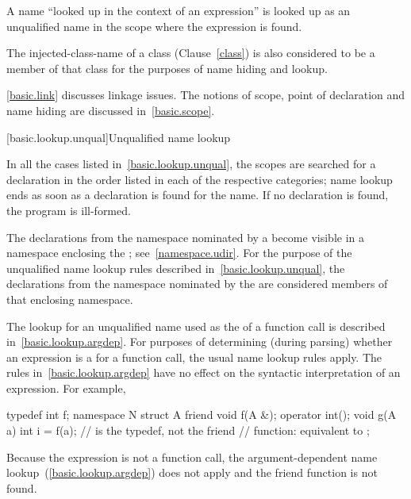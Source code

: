 \pnum
A name ``looked up in the context of an expression'' is looked up as an
unqualified name in the scope where the expression is found.

\pnum
The injected-class-name of a class (Clause~\ref{class}) is also
considered to be a member of that class for the purposes of name hiding
and lookup.

\pnum
\enternote \ref{basic.link} discusses linkage issues. The notions of
scope, point of declaration and name hiding are discussed
in~\ref{basic.scope}. \exitnote

[basic.lookup.unqual]{Unqualified name lookup}

\pnum
{}%
%
In all the cases listed in~\ref{basic.lookup.unqual}, the scopes are
searched for a declaration in the order listed in each of the respective
categories; name lookup ends as soon as a declaration is found for the
name. If no declaration is found, the program is ill-formed.

\pnum
The declarations from the namespace nominated by a
 become visible in a namespace enclosing the
; see~\ref{namespace.udir}. For the purpose of
the unqualified name lookup rules described
in~\ref{basic.lookup.unqual}, the declarations from the namespace
nominated by the  are considered members of
that enclosing namespace.

\pnum
The lookup for an unqualified name used as the
 of a function call is described
in~\ref{basic.lookup.argdep}. \enternote For purposes of determining
(during parsing) whether an expression is a
 for a function call, the usual name lookup
rules apply. The rules in~\ref{basic.lookup.argdep} have no effect on
the syntactic interpretation of an expression. For example,

\begin{codeblock}
typedef int f;
namespace N {
  struct A {
    friend void f(A &);
    operator int();
    void g(A a) {
      int i = f(a);         //  is the typedef, not the friend
                            // function: equivalent to 
    }
  };
}
\end{codeblock}

Because the expression is not a function call, the argument-dependent
name lookup~(\ref{basic.lookup.argdep}) does not apply and the friend
function  is not found. \exitnote

